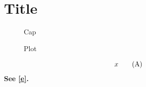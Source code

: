 \documentclass{article}
\begin{document}
\section{Title}
\begin{figure}\caption{Cap}\end{figure}
\begin{figure}\caption{Plot}\end{figure}
\begin{equation}x\tag{A\index{t}}\label{e}\end{equation}
\textbf{See \eqref{e}.}
\listoffigures
\printindex
\end{document}
